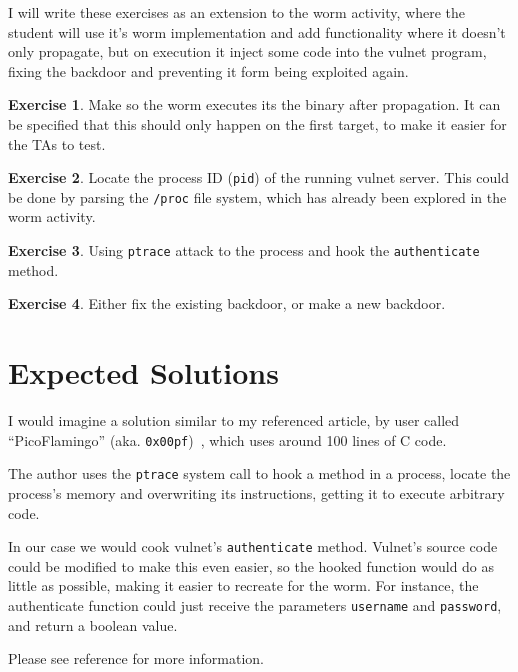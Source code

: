\documentclass[a4paper, 11pt]{article}
\theoremstyle{definition}
\newtheorem{exercise}{Exercise}
\begin{document}
I will write these exercises as an extension to the worm activity, where the
student will use it's worm implementation and add functionality where it doesn't
only propagate, but on execution it inject some code into the vulnet program,
fixing the backdoor and preventing it form being exploited again.

\begin{exercise}
  Make so the worm executes its the binary after propagation. It can be
  specified that this should only happen on the first target, to make it easier
  for the TAs to test.
\end{exercise}

\begin{exercise}
  Locate the process ID ({\tt pid}) of the running vulnet server. This could be
  done by parsing the {\tt /proc} file system, which has already been explored
  in the worm activity.
\end{exercise}

\begin{exercise}
  Using {\tt ptrace} attack to the process and hook the {\tt authenticate} method.
\end{exercise}

\begin{exercise}
  Either fix the existing backdoor, or make a new backdoor.
\end{exercise}


\section{Expected Solutions}
I would imagine a solution similar to my referenced article, by user
called ``PicoFlamingo'' (aka. {\tt 0x00pf})~\cite{0x00sec}, which uses
around 100 lines of C code.

The author uses the {\tt ptrace} system call to hook a method in a
process, locate the process's memory and overwriting its instructions,
getting it to execute arbitrary code.

In our case we would cook vulnet's {\tt authenticate} method. Vulnet's source
code could be modified to make this even easier, so the hooked function would do
as little as possible, making it easier to recreate for the worm. For instance,
the authenticate function could just receive the parameters {\tt username} and
{\tt password}, and return a boolean value.

Please see reference for more information.




\end{document}

